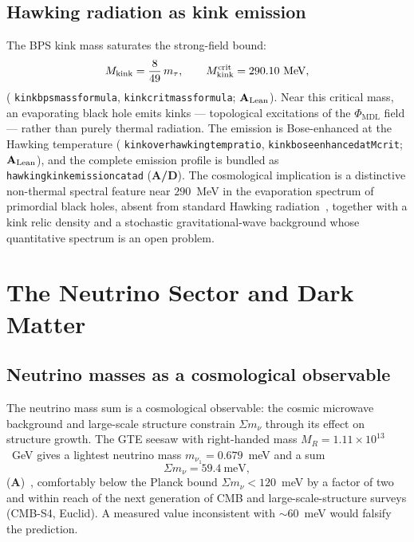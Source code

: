 \documentclass[11pt]{article}
\theoremstyle{remark}
\newcommand{\PHIMDL}{\Phi_{\mathrm{MDL}}}
\newcommand{\lean}[1]{%
  \penalty-100
  \begingroup\def\_{\textunderscore\allowbreak}\texttt{#1}\endgroup}
\newcommand{\Mkink}{M_{\rm kink}}
\newcommand{\mtau}{m_\tau}
\newcommand{\CatA}{\textbf{A}}
\newcommand{\CatAL}{\ensuremath{\textbf{A}_{\rm Lean}}}
\newcommand{\CatAD}{\textbf{A/D}}
\begin{document}
\subsection{Hawking radiation as kink emission}

The BPS kink mass saturates the strong-field bound:
\begin{equation}
  \Mkink = \frac{8}{49}\,\mtau,
  \qquad
  \Mkink^{\rm crit} = 290.10\ \text{MeV},
  \label{eq:mcrit}
\end{equation}
(\lean{kink\_bps\_mass\_formula}, \lean{kink\_crit\_mass\_formula}; \CatAL). Near
this critical mass, an evaporating black hole emits kinks --- topological
excitations of the $\PHIMDL$ field --- rather than purely thermal radiation. The
emission is Bose-enhanced at the Hawking temperature
(\lean{kink\_over\_hawking\_temp\_ratio}, \lean{kink\_bose\_enhanced\_at\_Mcrit};
\CatAL), and the complete emission profile is bundled as
\lean{hawking\_kink\_emission\_catad} (\CatAD). The cosmological implication is a
distinctive non-thermal spectral feature near $290$~MeV in the evaporation spectrum
of primordial black holes, absent from standard Hawking
radiation~\cite{Hawking1975}, together with a kink relic density and a stochastic
gravitational-wave background whose quantitative spectrum is an open problem.

\section{The Neutrino Sector and Dark Matter}
\label{sec:nu}

\subsection{Neutrino masses as a cosmological observable}

The neutrino mass sum is a cosmological observable: the cosmic microwave background
and large-scale structure constrain $\Sigma m_\nu$ through its effect on structure
growth. The GTE seesaw with right-handed mass $M_R = 1.11\times10^{13}$~GeV gives a
lightest neutrino mass $m_{\nu_1} = 0.679$~meV and a sum
\begin{equation}
  \Sigma m_\nu = 59.4\ \text{meV},
\end{equation}
(\CatA)~\cite{SpivackNeutrino}, comfortably below the Planck bound
$\Sigma m_\nu < 120$~meV by a factor of two and within reach of the next generation
of CMB and large-scale-structure surveys (CMB-S4, Euclid). A measured value
inconsistent with $\sim 60$~meV would falsify the prediction.
\end{document}
